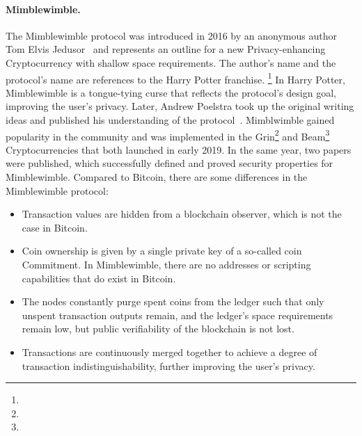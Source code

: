 \paragraph{Mimblewimble.} The Mimblewimble protocol was introduced in 2016 by an anonymous author Tom Elvis Jedusor~\cite{jedusor2016mimblewimble} and represents an outline for a new Privacy-enhancing Cryptocurrency with shallow space requirements.
The author’s name and the protocol's name are references to the Harry Potter franchise. \footnote{\urlharrypotter}
In Harry Potter, Mimblewimble is a tongue-tying curse that reflects the protocol's design goal, improving the user's privacy.
Later, Andrew Poelstra took up the original writing ideas and published his understanding of the protocol~\cite{poelstra2016mimblewimble}.
Mimblwimble gained popularity in the community and was implemented in the Grin\footnote{\urlgrin} and Beam\footnote{\urlbeam} Cryptocurrencies that both launched in early 2019.
In the same year, two papers~\cite{fuchsbauer2019aggregate,betarte2019towards} were published, which successfully defined and proved security properties for Mimblewimble.
Compared to Bitcoin, there are some differences in the Mimblewimble protocol:
\begin{itemize}
    \item Transaction values are hidden from a blockchain observer, which is not the case in Bitcoin.
    \item Coin ownership is given by a single private key of a so-called coin Commitment.
    In Mimblewimble, there are no addresses or scripting capabilities that do exist in Bitcoin.
    \item The nodes constantly purge spent coins from the ledger such that only unspent transaction outputs remain, and the ledger's space requirements remain low, but public verifiability of the blockchain is not lost.
    \item Transactions are continuously merged together to achieve a degree of transaction indistinguishability, further improving the user's privacy.
\end{itemize}

